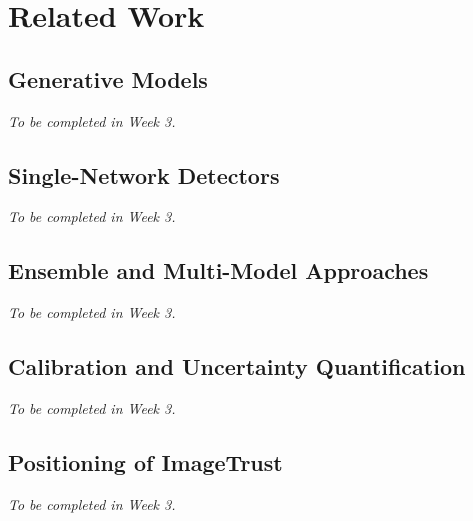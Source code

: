 
\chapter{Related Work}\label{chap:related}


\section{Generative Models}\label{sec:gen_models}
\textit{To be completed in Week 3.}

\section{Single-Network Detectors}\label{sec:single_detectors}
\textit{To be completed in Week 3.}

\section{Ensemble and Multi-Model Approaches}\label{sec:ensemble}
\textit{To be completed in Week 3.}

\section{Calibration and Uncertainty Quantification}\label{sec:related_calibration}
\textit{To be completed in Week 3.}

\section{Positioning of ImageTrust}\label{sec:positioning}
\textit{To be completed in Week 3.}
